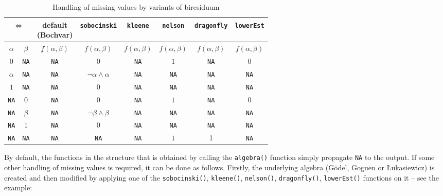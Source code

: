 \documentclass[review]{elsarticle}
\newcommand{\code}[1]{\texttt{#1}}
\begin{document}
\begin{table}
    \centering
    \caption{Handling of missing values by variants of biresiduum}
    \label{tab:equivalences}
    \begin{tabular}{cc|cccccc}
        \multicolumn{2}{c|}{$\Leftrightarrow$} & \makecell{default \\ (Bochvar)} & \texttt{sobocinski} & \texttt{kleene} & \texttt{nelson} & \texttt{dragonfly} & \texttt{lowerEst} \\
        \hline
        $\alpha$    & $\beta$     & $f(\alpha, \beta)$ & $f(\alpha, \beta)$ & $f(\alpha, \beta)$ & $f(\alpha, \beta)$ & $f(\alpha, \beta)$ & $f(\alpha, \beta)$ \\
        $0$         & \code{NA} & \code{NA} & $0$         & \code{NA} & $1$         & \code{NA} & 0 \\
        $\alpha$    & \code{NA} & \code{NA} & $\neg \alpha \wedge \alpha$         & \code{NA} & \code{NA} & \code{NA} & \code{NA} \\
        $1$         & \code{NA} & \code{NA} & $0$         & \code{NA} & \code{NA} & \code{NA} & \code{NA} \\
        \code{NA} & $0$         & \code{NA} & $0$         & \code{NA} & $1$         & \code{NA} & 0 \\
        \code{NA} & $\beta$     & \code{NA} & $\neg \beta \wedge \beta$         & \code{NA} & \code{NA} & \code{NA} & \code{NA} \\
        \code{NA} & $1$         & \code{NA} & $0$         & \code{NA} & \code{NA} & \code{NA} & \code{NA} \\
        \code{NA} & \code{NA} & \code{NA} & \code{NA} & \code{NA} & $1$ & 1 & \code{NA} 
    \end{tabular}
\end{table}



By default, the functions in the structure that is obtained by calling the \code{algebra()} function simply propagate \code{NA} to the output. If some other handling of missing values is required, it can be done as follows. Firstly, the underlying algebra (G\"odel, Goguen or \L{}ukasiewicz) is created and then modified by applying one of the \code{sobocinski()}, \code{kleene()}, \code{nelson()}, \code{dragonfly()}, \code{lowerEst()} functions on it -- see the example:
%




\end{document}
